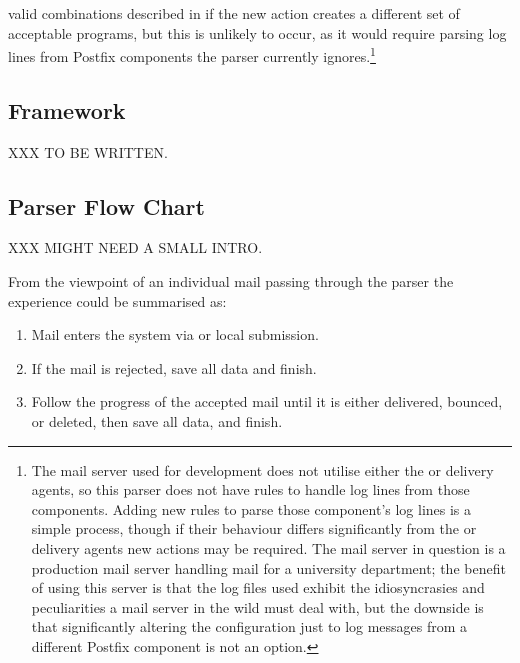 valid combinations described in  if the
new action creates a different set of acceptable programs, but this is
unlikely to occur, as it would require parsing log lines from Postfix
components the parser currently ignores.\footnote{The mail server used for
development does not utilise either the  or 
delivery agents, so this parser does not have rules to handle log lines
from those components.  Adding new rules to parse those component's log
lines is a simple process, though if their behaviour differs significantly
from the  or  delivery agents new actions may be
required.  The mail server in question is a production mail server handling
mail for a university department; the benefit of using this server is that
the log files used exhibit the idiosyncrasies and peculiarities a mail
server in the wild must deal with, but the downside is that significantly
altering the configuration just to log messages from a different Postfix
component is not an option.}


\subsection{Framework}

XXX TO BE WRITTEN\@.


\subsection{Parser Flow Chart}

\label{flow-chart}

XXX MIGHT NEED A SMALL INTRO\@.

From the viewpoint of an individual mail passing through the parser the
experience could be summarised as:

\begin{enumerate}

    \item Mail enters the system via \SMTP{} or local submission.

    \item If the mail is rejected, save all data and finish.

    \item Follow the progress of the accepted mail until it is either
        delivered, bounced, or deleted, then save all data, and finish.

\end{enumerate}

